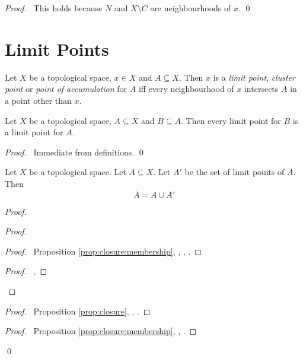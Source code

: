 \begin{proof}
  \pf\ This holds because $N$ and $X \setminus C$ are neighbourhoods of $x$. \qed
\end{proof}

\section{Limit Points}

\begin{df}
  Let $X$ be a topological space, $x \in X$ and $A \subseteq X$. Then $x$ is a \emph{limit point}, \emph{cluster point} or \emph{point of accumulation} for $A$ iff every neighbourhood of $x$ intersects $A$ in a point other than $x$.
\end{df}

\begin{lm}
\label{lm:limit_point:subset}
 Let $X$ be a topological space, $A \subseteq X$ and $B \subseteq A$. Then 
every limit point for $B$ is a limit point for $A$.
\end{lm}

\begin{proof}
 \pf\ Immediate from definitions. \qed
\end{proof}

\begin{prop}
  \label{prop:limit_points:closure}
  Let $X$ be a topological space. Let $A \subseteq X$. Let $A'$ be the set of limit points of $A$. Then
  \[ \overline{A} = A \cup A' \]
\end{prop}

\begin{proof}
  \pf
  \begin{proof}
    \pf
    \begin{proof}
      \pf\ Proposition \ref{prop:closure:membership}, , , .
    \end{proof}
    \begin{proof}
      \pf\ , 
    \end{proof}
  \end{proof}
  \begin{proof}
    \pf\ Proposition \ref{prop:closure}, , .
  \end{proof}
  \begin{proof}
    \pf\ Proposition \ref{prop:closure:membership}, , .
  \end{proof}
  \qed
\end{proof}

